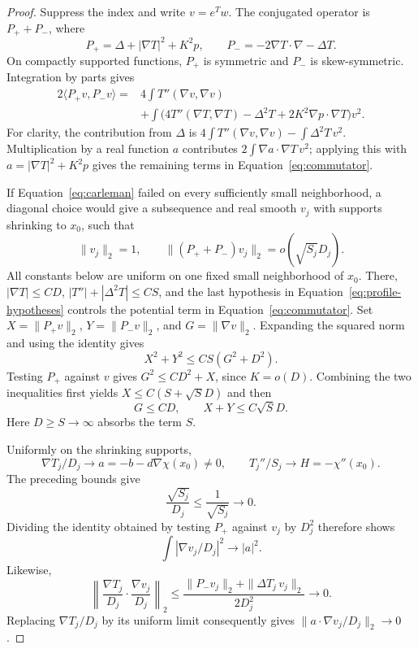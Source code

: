 \begin{proof}
Suppress the index and write $v=e^T w$.  The conjugated operator is
$P_++P_-$, where
\[
 P_+=\Delta+|\nabla T|^2+K^2p,
 \qquad P_-=-2\nabla T\cdot\nabla-\Delta T.
\]
On compactly supported functions, $P_+$ is symmetric and $P_-$ is
skew-symmetric.  Integration by parts gives
\begin{equation}\label{eq:commutator}
 \begin{split}
 2\langle P_+v,P_-v\rangle
  ={}&4\int T''(\nabla v,\nabla v)\\
    &+\int\bigl(4T''(\nabla T,\nabla T)-\Delta^2T
             +2K^2\nabla p\cdot\nabla T\bigr)v^2.
 \end{split}
\end{equation}
For clarity, the contribution from $\Delta$ is
$4\int T''(\nabla v,\nabla v)-\int\Delta^2T\,v^2$.
Multiplication by a real function $a$ contributes
$2\int\nabla a\cdot\nabla T\,v^2$; applying this with
$a=|\nabla T|^2+K^2p$ gives the remaining terms in
Equation~\eqref{eq:commutator}.

If Equation~\eqref{eq:carleman} failed on every sufficiently small
neighborhood, a diagonal choice would give a subsequence and real
smooth $v_j$ with supports shrinking to $x_0$, such that
\[
 \|v_j\|_2=1,
 \qquad
 \|(P_++P_-)v_j\|_2=o(\sqrt{S_j}D_j).
\]
All constants below are uniform on one fixed small neighborhood of
$x_0$.  There, $|\nabla T|\le CD$, $|T''|+|\Delta^2T|\le CS$,
and the last hypothesis in Equation~\eqref{eq:profile-hypotheses}
controls the potential term in Equation~\eqref{eq:commutator}.
Set $X=\|P_+v\|_2$, $Y=\|P_-v\|_2$, and
$G=\|\nabla v\|_2$.  Expanding the squared norm and using the
identity gives
\[
 X^2+Y^2\le CS(G^2+D^2).
\]
Testing $P_+$ against $v$ gives $G^2\le CD^2+X$, since $K=o(D)$.
Combining the two inequalities first yields
$X\le C(S+\sqrt S D)$ and then
\[
 G\le CD,
 \qquad X+Y\le C\sqrt S D.
\]
Here $D\ge S\to\infty$ absorbs the term $S$.

Uniformly on the shrinking supports,
\[
 \nabla T_j/D_j\to a=-b-d\nabla\chi(x_0)\ne0,
 \qquad T_j''/S_j\to H=-\chi''(x_0).
\]
The preceding bounds give
\[
 \frac{\sqrt{S_j}}{D_j}\le\frac1{\sqrt{S_j}}\longrightarrow0.
\]
Dividing the identity obtained by testing $P_+$ against $v_j$ by
$D_j^2$ therefore shows
\[
 \int|\nabla v_j/D_j|^2\longrightarrow |a|^2.
\]
Likewise,
\[
 \left\|\frac{\nabla T_j}{D_j}\cdot
                \frac{\nabla v_j}{D_j}\right\|_2
 \le \frac{\|P_-v_j\|_2+\|\Delta T_j\,v_j\|_2}{2D_j^2}
 \longrightarrow0.
\]
Replacing $\nabla T_j/D_j$ by its uniform limit consequently gives
$\|a\cdot\nabla v_j/D_j\|_2\to0$.


\end{proof}
